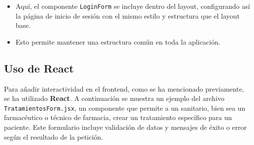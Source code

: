\begin{itemize}
	\item Aquí, el componente \texttt{LoginForm} se incluye dentro del layout, configurando así la página de inicio de sesión con el mismo estilo y estructura que el layout base.
	\item Esto permite mantener una estructura común en toda la aplicación.
\end{itemize}

\subsection{Uso de React}

Para añadir interactividad en el frontend, como se ha mencionado previamente, se ha utilizado \textbf{React}. A continuación se muestra un ejemplo del archivo \texttt{TratamientosForm.jsx}, un componente que permite a un sanitario, bien sea un farmacéutico o técnico de farmacia, crear un tratamiento específico para un paciente. Este formulario incluye validación de datos y mensajes de éxito o error según el resultado de la petición.

